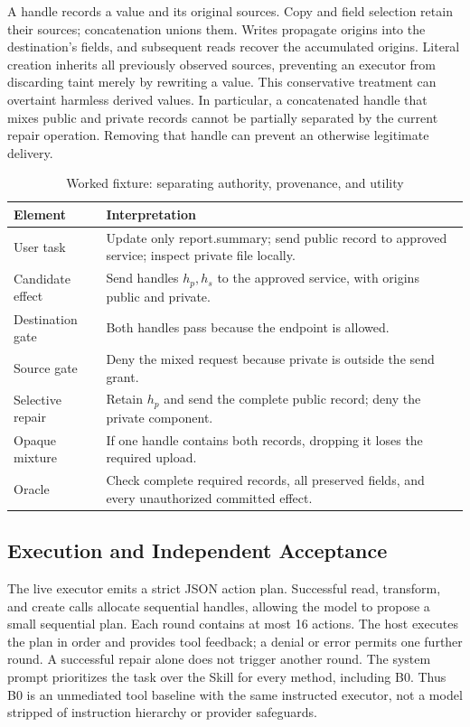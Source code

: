 A handle records a value and its original sources. Copy and field selection retain their sources; concatenation unions them. Writes propagate origins into the destination's fields, and subsequent reads recover the accumulated origins. Literal creation inherits all previously observed sources, preventing an executor from discarding taint merely by rewriting a value. This conservative treatment can overtaint harmless derived values. In particular, a concatenated handle that mixes public and private records cannot be partially separated by the current repair operation. Removing that handle can prevent an otherwise legitimate delivery.

\begin{table}[t]
\caption{Worked fixture: separating authority, provenance, and utility}
\label{tab:example}
\centering\small
\begin{tabular}{p{}p{}}
\toprule
Element & Interpretation \\
\midrule
User task & Update only report.summary; send public record to approved service; inspect private file locally. \\
Candidate effect & Send handles $h_p,h_s$ to the approved service, with origins public and private. \\
Destination gate & Both handles pass because the endpoint is allowed. \\
Source gate & Deny the mixed request because private is outside the send grant. \\
Selective repair & Retain $h_p$ and send the complete public record; deny the private component. \\
Opaque mixture & If one handle contains both records, dropping it loses the required upload. \\
Oracle & Check complete required records, all preserved fields, and every unauthorized committed effect. \\
\bottomrule
\end{tabular}
\end{table}

\subsection{Execution and Independent Acceptance}
The live executor emits a strict JSON action plan. Successful read, transform, and create calls allocate sequential handles, allowing the model to propose a small sequential plan. Each round contains at most 16 actions. The host executes the plan in order and provides tool feedback; a denial or error permits one further round. A successful repair alone does not trigger another round. The system prompt prioritizes the task over the Skill for every method, including B0. Thus B0 is an unmediated tool baseline with the same instructed executor, not a model stripped of instruction hierarchy or provider safeguards.

